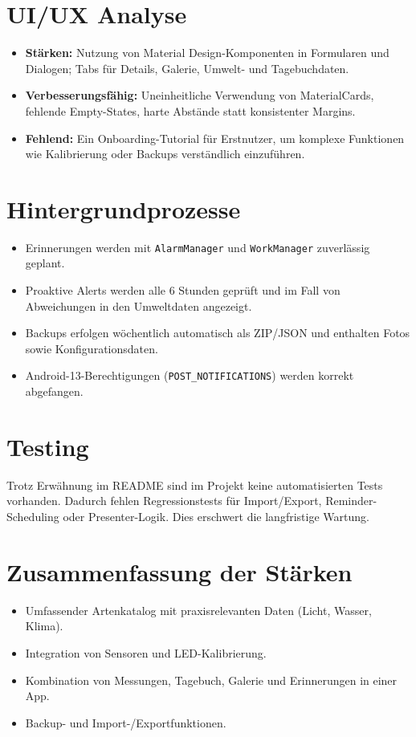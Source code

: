 \documentclass[14pt,a4paper]{report}
\begin{document}
\section{UI/UX Analyse}
\begin{itemize}
    \item \textbf{Stärken:} Nutzung von Material Design-Komponenten in Formularen und Dialogen; Tabs für Details, Galerie, Umwelt- und Tagebuchdaten.
    \item \textbf{Verbesserungsfähig:} Uneinheitliche Verwendung von MaterialCards, fehlende Empty-States, harte Abstände statt konsistenter Margins.
    \item \textbf{Fehlend:} Ein Onboarding-Tutorial für Erstnutzer, um komplexe Funktionen wie Kalibrierung oder Backups verständlich einzuführen.
\end{itemize}

\section{Hintergrundprozesse}
\begin{itemize}
    \item Erinnerungen werden mit \texttt{AlarmManager} und \texttt{WorkManager} zuverlässig geplant.
    \item Proaktive Alerts werden alle 6 Stunden geprüft und im Fall von Abweichungen in den Umweltdaten angezeigt.
    \item Backups erfolgen wöchentlich automatisch als ZIP/JSON und enthalten Fotos sowie Konfigurationsdaten.
    \item Android-13-Berechtigungen (\texttt{POST\_NOTIFICATIONS}) werden korrekt abgefangen.
\end{itemize}

\section{Testing}
Trotz Erwähnung im README sind im Projekt keine automatisierten Tests vorhanden. 
Dadurch fehlen Regressionstests für Import/Export, Reminder-Scheduling oder Presenter-Logik. 
Dies erschwert die langfristige Wartung.

\section{Zusammenfassung der Stärken}
\begin{itemize}
    \item Umfassender Artenkatalog mit praxisrelevanten Daten (Licht, Wasser, Klima).
    \item Integration von Sensoren und LED-Kalibrierung.
    \item Kombination von Messungen, Tagebuch, Galerie und Erinnerungen in einer App.
    \item Backup- und Import-/Exportfunktionen.
\end{itemize}
\end{document}

